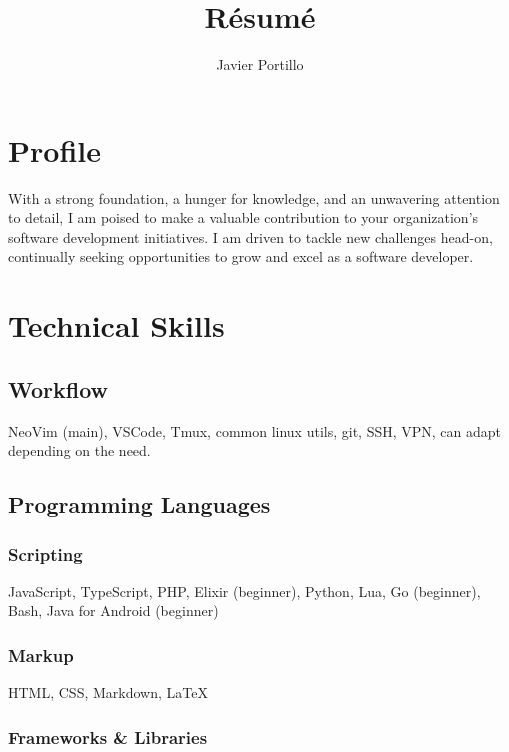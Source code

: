 \documentclass{article}
\begin{document}
\title{R\'esum\'e}
\author{Javier Portillo}

\maketitle

\section{Profile}

With a strong foundation, a hunger for knowledge, and an unwavering attention to detail, I am poised to make a valuable contribution to your organization's software development initiatives. I am driven to tackle new challenges head-on, continually seeking opportunities to grow and excel as a software developer.

\section{Technical Skills}

\subsection{Workflow}

NeoVim (main), VSCode, Tmux, common linux utils, git, SSH, VPN, can adapt depending on the need.

\subsection{Programming Languages}

\subsubsection{Scripting}

JavaScript, TypeScript, PHP, Elixir (beginner), Python, Lua, Go (beginner), Bash, Java for Android (beginner)

\subsubsection{Markup}

HTML, CSS, Markdown, \LaTeX{}

\subsubsection{Frameworks \& Libraries}
\end{document}
